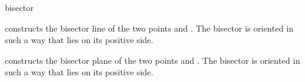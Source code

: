 \begin{ccRefFunction}{bisector}

{constructs the bisector line of the two points  and .
The bisector is oriented in such a way that  lies on its
positive side. }

{constructs the bisector plane of the two points  and .
The bisector is oriented in such a way that  lies on its
positive side. }

\end{ccRefFunction}
